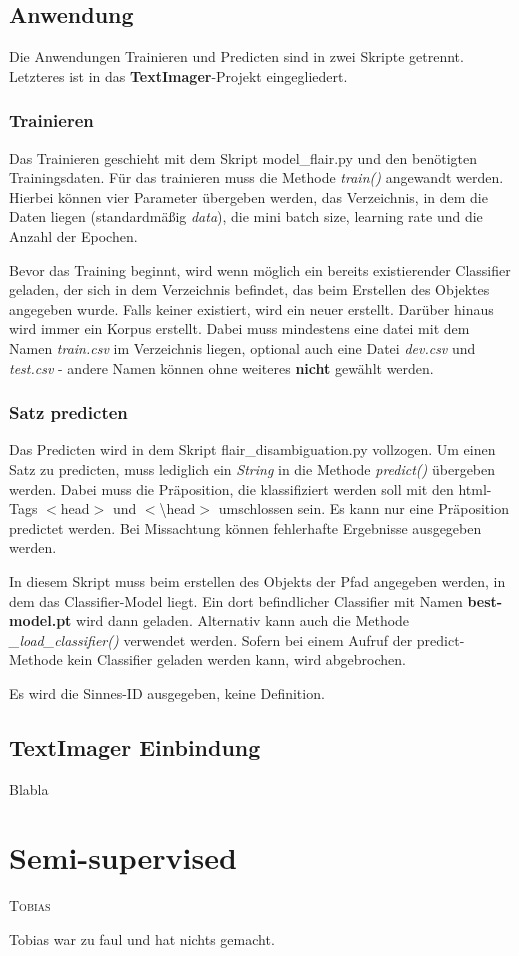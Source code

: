 \documentclass[10pt,a4paper]{article}
\newcommand{\chapterauthor}[1]{%
	{\parindent0pt\vspace*{-5pt}\hspace*{\fill}%
  \linespread{1.1}\large\scshape#1%
  \par\nobreak\vspace*{10pt}}
}
\begin{document}
\subsection{Anwendung}
\begin{flushleft}
Die Anwendungen Trainieren und Predicten sind in zwei Skripte getrennt. Letzteres ist in das \textbf{TextImager}-Projekt eingegliedert.
\end{flushleft}

\subsubsection{Trainieren}
\begin{flushleft}
Das Trainieren geschieht mit dem Skript model\_flair.py und den benötigten Trainingsdaten. Für das trainieren muss die Methode \textit{train()} angewandt werden. Hierbei können vier Parameter übergeben werden, das Verzeichnis, in dem die Daten liegen (standardmäßig \textit{data}), die mini batch size, learning rate und die Anzahl der Epochen.

Bevor das Training beginnt, wird wenn möglich ein bereits existierender Classifier geladen, der sich in dem Verzeichnis befindet, das beim Erstellen des Objektes angegeben wurde. Falls keiner existiert, wird ein neuer erstellt. Darüber hinaus wird immer ein Korpus erstellt. Dabei muss mindestens eine datei mit dem Namen \textit{train.csv} im Verzeichnis liegen, optional auch eine Datei \textit{dev.csv} und \textit{test.csv} - andere Namen können ohne weiteres \textbf{nicht} gewählt werden.
\end{flushleft}

\subsubsection{Satz predicten}
Das Predicten wird in dem Skript flair\_disambiguation.py vollzogen. Um einen Satz zu predicten, muss lediglich ein \textit{String} in die Methode \textit{predict()} übergeben werden. Dabei muss die Präposition, die klassifiziert werden soll mit den html-Tags $<$head$>$ und $<$\textbackslash head$>$ umschlossen sein. Es kann nur eine Präposition predictet werden. Bei Missachtung können fehlerhafte Ergebnisse ausgegeben werden.

In diesem Skript muss beim erstellen des Objekts der Pfad angegeben werden, in dem das Classifier-Model liegt. Ein dort befindlicher Classifier mit Namen \textbf{best-model.pt} wird dann geladen. Alternativ kann auch die Methode \textit{\_load\_classifier()} verwendet werden. Sofern bei einem Aufruf der predict-Methode kein Classifier geladen werden kann, wird abgebrochen.

Es wird die Sinnes-ID ausgegeben, keine Definition.

\subsection{TextImager Einbindung}
\begin{flushleft}
Blabla
\end{flushleft}

\newpage

\section{Semi-supervised}
\chapterauthor{Tobias}
Tobias war zu faul und hat nichts gemacht.


\begingroup
\raggedright
\sloppy
\printbibliography
\endgroup
\end{document}
